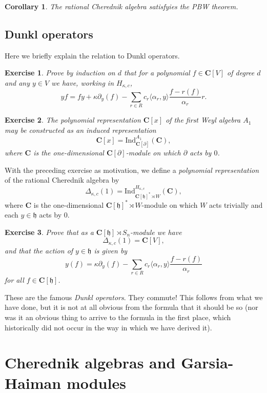 \documentclass[12pt, reqno]{amsart}
\numberwithin{equation}{section}
\theoremstyle{definition}
\theoremstyle{plain}
\newtheorem{corollary}[theorem]{Corollary}
\newtheorem{exercise}{Exercise}
\newcommand{\CC}{\mathbf{C}}
\newcommand{\hh}{\mathfrak{h}}
\newcommand{\la}{\langle}
\newcommand{\ra}{\rangle}
\begin{document}
\begin{corollary}
The rational Cherednik algebra satisfyies the PBW theorem.	
\end{corollary}

\subsection{Dunkl operators}

Here we briefly explain the relation to Dunkl operators. 
\begin{exercise}
Prove by induction on $d$ that for a polynomial $f \in \CC[V]$ of degree $d$ and any $y \in V$ we have, working in $H_{\kappa,c}$,
$$yf=fy+\kappa \partial_y(f)-\sum_{r \in R} c_r \la \alpha_r, y \ra \frac{f-r(f)}{\alpha_r} r.$$
\end{exercise}

\begin{exercise} The polynomial representation $\CC[x]$ of the first Weyl algebra $A_1$ may be constructed as an induced representation
$$\CC[x]=\mathrm{Ind}_{\CC[\partial]}^{A_1}(\CC),$$ where $\CC$ is the one-dimensional $\CC[\partial]$-module on which $\partial$ acts by $0$.
\end{exercise}

With the preceding exercise as motivation, we define a \emph{polynomial representation} of the rational Cherednik algebra by
$$\Delta_{\kappa,c}(1)=\mathrm{Ind}_{\CC[\hh]^* \rtimes W}^{H_{\kappa,c}}(\CC),$$ where $\CC$ is the one-dimensional $\CC[\hh]^* \rtimes W$-module on which $W$ acts trivially and each $y \in \hh$ acts by $0$.
\begin{exercise}
Prove that as a $\CC[\hh] \rtimes S_n$-module we have
$$\Delta_{\kappa,c}(1)=\CC[V],$$ and that the action of $y \in \hh$ is given by
$$y(f)=\kappa \partial_y(f)-\sum_{r \in R} c_r \la \alpha_r,y \ra \frac{f-r(f)}{\alpha_r}$$ for all $f \in \CC[\hh]$. 
\end{exercise} These are the famous \emph{Dunkl operators}. They commute! This follows from what we have done, but it is not at all obvious from the formula that it should be so (nor was it an obvious thing to arrive to the formula in the first place, which historically did not occur in the way in which we have derived it).

\section{Cherednik algebras and Garsia-Haiman modules}
\end{document}
